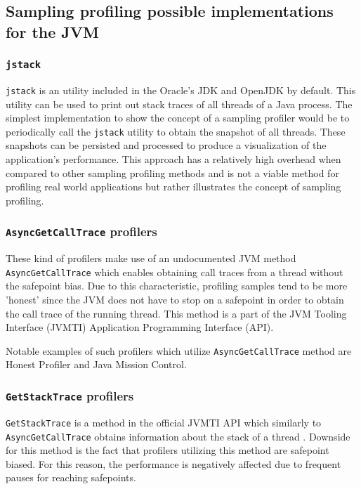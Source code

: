 \documentclass[..thesis.tex]{subfiles}
\begin{document}
\subsection{Sampling profiling possible implementations for the JVM}

\subsubsection{\texttt{jstack}}
\texttt{jstack} is an utility included in the Oracle's JDK and OpenJDK by default. This utility can be used to print out stack traces of all threads of a Java process.\cite{jstack} The simplest implementation to show the concept of a sampling profiler would be to periodically call the \texttt{jstack} utility to obtain the snapshot of all threads. These snapshots can be persisted and processed to produce a visualization of the application's performance. This approach has a relatively high overhead when compared to other sampling profiling methods and is not a viable method for profiling real world applications but rather illustrates the concept of sampling profiling.

\subsubsection{\texttt{AsyncGetCallTrace} profilers}
These kind of profilers make use of an undocumented JVM method \texttt{Async\-Get\-Call\-Trace} \cite{agct_source} which enables obtaining call traces from a thread without the safepoint bias. Due to this characteristic, profiling samples tend to be more 'honest' since the JVM does not have to stop on a safepoint in order to obtain the call trace of the running thread. This method is a part of the JVM Tooling Interface (JVMTI) Application Programming Interface (API).

Notable examples of such profilers which utilize \texttt{Async\-Get\-Call\-Trace} method  are Honest Profiler and Java Mission Control. 


\subsubsection{\texttt{GetStackTrace} profilers}
\texttt{GetStackTrace} is a method in the official JVMTI API which similarly to \texttt{Async\-Get\-Call\-Trace} obtains information about the stack of a thread \cite{jvmti_doc}. Downside for this method is the fact that profilers utilizing this method are safepoint biased. For this reason, the performance is negatively affected due to frequent pauses for reaching safepoints.
\end{document}
